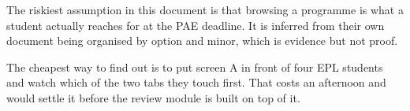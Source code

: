 \documentclass[11pt,a4paper]{article}
\begin{document}
\vfill
\begin{center}
\begin{tcolorbox}[width=0.94\textwidth,colback=studenslt,colframe=studens,
  arc=2pt,fonttitle=\sffamily\bfseries,title={What would make this wrong}]
\sffamily\small
The riskiest assumption in this document is that browsing a programme is what a
student actually reaches for at the PAE deadline. It is inferred from their own
document being organised by option and minor, which is evidence but not proof.

The cheapest way to find out is to put screen A in front of four EPL students
and watch which of the two tabs they touch first. That costs an afternoon and
would settle it before the review module is built on top of it.
\end{tcolorbox}
\end{center}
\end{document}
